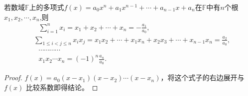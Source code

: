 \documentclass[../../main.tex]{subfiles}%
\begin{document}
\begin{theorem}[Vieta定理]\label{theorem:Vieta定理}
若数域\(\mathbb{F}\)上的多项式\(f(x)=a_0x^n + a_1x^{n - 1}+\cdots + a_{n - 1}x + a_n\)在\(\mathbb{F}\)中有\(n\)个根\(x_1,x_2,\cdots,x_n\),则
\begin{align*}
&\,\,\,\, \sum_{i=1}^n{x_i}=x_1+x_2+\cdots +x_n=-\frac{a_1}{a_0},
\\
&\sum_{1\leqslant i<j\leqslant n}{x_ix_j}=x_1x_2+\cdots +x_1x_n+x_2x_3+\cdots +x_{n-1}x_n=\frac{a_2}{a_0},
\\
&\,\,\,\, \cdots \cdots \cdots \cdots 
\\
&\,\,\,\, x_1x_2\cdots x_n=(-1)^n\frac{a_n}{a_0}.
\end{align*}
\end{theorem}
\begin{proof}
$f(x) = a_0 (x - x_1)(x - x_2) \cdots (x - x_n)$，将这个式子的右边展开与 $f(x)$ 比较系数即得结论。
\end{proof}
\end{document}
